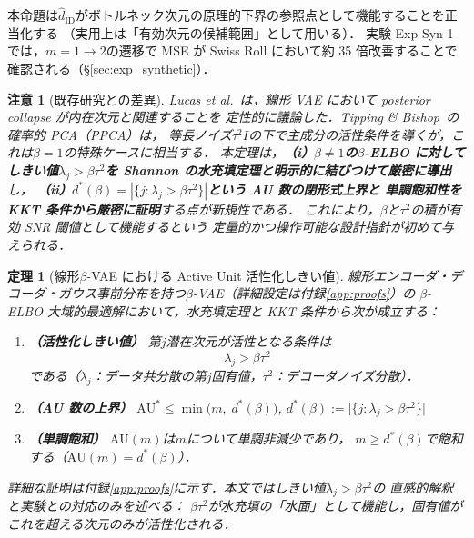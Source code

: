 \documentclass[11pt,a4paper]{jsarticle}
\newtheorem{theorem}{定理}
\newtheorem{remark}{注意}
\begin{document}
本命題は$\hat{d}_\mathrm{ID}$がボトルネック次元の原理的下界の参照点として機能することを正当化する
（実用上は「有効次元の候補範囲」として用いる）．
実験 Exp-Syn-1 では，$m = 1 \to 2$の遷移で MSE が Swiss Roll において約 35 倍改善することで確認される（§\ref{sec:exp_synthetic}）．

\begin{remark}[既存研究との差異]
Lucas et al.~\cite{lucas2019elbo}は，線形 VAE において posterior collapse が内在次元と関連することを
定性的に議論した．Tipping \& Bishop~\cite{tippingbishop1999ppca}の確率的 PCA（PPCA）は，
等長ノイズ$\tau^2 I$の下で主成分の活性条件を導くが，これは$\beta = 1$の特殊ケースに相当する．
本定理は，\textbf{（i）$\beta \neq 1$の$\beta$-ELBO に対してしきい値$\lambda_j > \beta\tau^2$を
Shannon の水充填定理\cite{cover2006elements}と明示的に結びつけて厳密に導出}し，
\textbf{（ii）$d^*(\beta) = |\{j:\lambda_j > \beta\tau^2\}|$という AU 数の閉形式上界と
単調飽和性を KKT 条件から厳密に証明}する点が新規性である．
これにより，$\beta$と$\tau^2$の積が有効 SNR 閾値として機能するという
定量的かつ操作可能な設計指針が初めて与えられる．
\end{remark}

\begin{theorem}[線形$\beta$-VAE における Active Unit 活性化しきい値]\label{thm:linear_vae}
線形エンコーダ・デコーダ・ガウス事前分布を持つ$\beta$-VAE（詳細設定は付録\ref{app:proofs}）の
$\beta$-ELBO 大域的最適解において，水充填定理と KKT 条件から次が成立する：

\begin{enumerate}
  \item \textbf{（活性化しきい値）} 第$j$潜在次元が活性となる条件は
        \begin{equation}
          \lambda_j > \beta \tau^2 \label{eq:au_threshold}
        \end{equation}
        である（$\lambda_j$：データ共分散の第$j$固有値，$\tau^2$：デコーダノイズ分散）．
  \item \textbf{（AU 数の上界）}
        $\mathrm{AU}^* \leq \min\bigl(m,\; d^*(\beta)\bigr)$,\quad
        $d^*(\beta) := \bigl|\{j : \lambda_j > \beta\tau^2\}\bigr|$
  \item \textbf{（単調飽和）}
        $\mathrm{AU}(m)$は$m$について単調非減少であり，
        $m \geq d^*(\beta)$で飽和する（$\mathrm{AU}(m) = d^*(\beta)$）．
\end{enumerate}

\noindent
詳細な証明は付録\ref{app:proofs}に示す．本文ではしきい値$\lambda_j > \beta\tau^2$の
直感的解釈と実験との対応のみを述べる：
$\beta\tau^2$が水充填の「水面」として機能し，固有値がこれを超える次元のみが活性化される．
\end{theorem}
\end{document}
